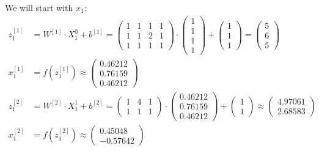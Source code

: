 \documentclass[12pt]{article}
\begin{document}
\begin{enumerate}[leftmargin=\labelsep]
          We will start with $x_1$:
            \begingroup
            \allowdisplaybreaks
            \begin{align*}
                z^{[1]}_1 &= {W}^{[1]} \cdot {X}^{0}_1 + {b}^{[1]} = \begin{pmatrix} 1 & 1 & 1 & 1 \\ 1 & 1 & 2 & 1 \\ 1 & 1 & 1 & 1\end{pmatrix} \cdot  \begin{pmatrix} 1 \\ 1 \\ 1 \\ 1 \end{pmatrix} +
                \begin{pmatrix} 1 \\ 1 \\ 1\end{pmatrix} = \begin{pmatrix} 5 \\ 6 \\ 5\end{pmatrix} \\
                {x}^{[1]}_1 &= f\left({z}^{[1]}_1\right) \approx \begin{pmatrix} 0.46212 \\ 0.76159 \\ 0.46212\end{pmatrix} \\
                z^{[2]}_1 &= {W}^{[2]} \cdot {X}^{1}_1 + {b}^{[2]} = \begin{pmatrix} 1 & 4 & 1 \\ 1 & 1 & 1\end{pmatrix} \cdot \begin{pmatrix} 0.46212 \\ 0.76159 \\ 0.46212 \end{pmatrix} +
                \begin{pmatrix} 1 \\ 1\end{pmatrix} \approx \begin{pmatrix} 4.97061 \\ 2.68583\end{pmatrix} \\
                {x}^{[2]}_1 &= f\left({z}^{[2]}_1\right) \approx \begin{pmatrix} 0.45048 \\ -0.57642\end{pmatrix} \\

\end{align*}
\end{enumerate}
\end{document}
